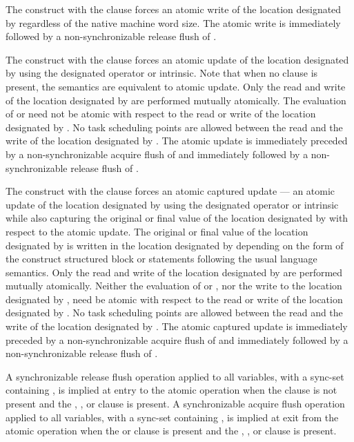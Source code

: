 The  construct with the  clause forces an atomic write of the location 
designated by  regardless of the native machine word size. The atomic
write is immediately followed by a non-synchronizable release flush of .

The  construct with the  clause forces an atomic update of the location 
designated by  using the designated operator or intrinsic. Note that when no clause is 
present, the semantics are equivalent to atomic update. Only the read and write of the 
location designated by  are performed mutually atomically. The evaluation of  or 
 need not be atomic with respect to the read or write of the location designated 
by . No task scheduling points are allowed between the read and the write of the 
location designated by . The atomic update is immediately preceded by
a non-synchronizable acquire flush of  and immediately followed by a
non-synchronizable release flush of .

The  construct with the  clause forces an atomic
captured update --- an atomic update of the 
location designated by  using the designated operator or intrinsic while also capturing 
the original or final value of the location designated by  with respect to the atomic 
update. The original or final value of the location designated by  is written in the 
location designated by  depending on the form of the  construct structured 
block or statements following the usual language semantics. Only the read and write of 
the location designated by  are performed mutually atomically. Neither the evaluation 
of  or , nor the write to the location designated by , need be atomic with
respect to the read or write of the location designated by . No task scheduling points 
are allowed between the read and the write of the location designated by
. The atomic captured update is immediately preceded by a
non-synchronizable acquire flush of  and immediately followed by a
non-synchronizable release flush of .

A synchronizable release flush operation applied to all variables, with a
sync-set containing , is implied at entry to the atomic operation when
the  clause is not present and the , ,
or  clause is present.  A synchronizable acquire flush
operation applied to all variables, with a sync-set containing , is
implied at exit from the atomic operation when the  or
 clause is present and the , , or
 clause is present. 

